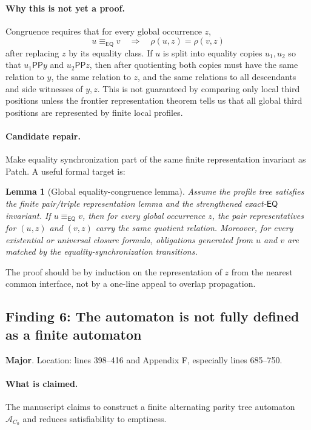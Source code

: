 \documentclass[11pt]{article}
\newcommand{\EQ}{\mathsf{EQ}}
\newcommand{\PP}{\mathsf{PP}}
\newcommand{\Aut}{\mathcal A}
\newtheorem{lemma}{Lemma}
\newcommand{\Major}{\textbf{\textcolor{maj}{Major}}}
\begin{document}
\paragraph{Why this is not yet a proof.}
Congruence requires that for every global occurrence $z$,
\[
  u\equiv_{\EQ}v \quad\Longrightarrow\quad
  \rho(u,z)=\rho(v,z)
\]
after replacing $z$ by its equality class.  If $u$ is split into equality copies $u_1,u_2$ so that $u_1\PP y$ and $u_2\PP z$, then after quotienting both copies must have the same relation to $y$, the same relation to $z$, and the same relations to all descendants and side witnesses of $y,z$.  This is not guaranteed by comparing only local third positions unless the frontier representation theorem tells us that all global third positions are represented by finite local profiles.

\paragraph{Candidate repair.}
Make equality synchronization part of the same finite representation invariant as \textsf{Patch}.  A useful formal target is:

\begin{lemma}[Global equality-congruence lemma]
Assume the profile tree satisfies the finite pair/triple representation lemma and the strengthened exact-$\EQ$ invariant.  If $u\equiv_{\EQ}v$, then for every global occurrence $z$, the pair representatives for $(u,z)$ and $(v,z)$ carry the same quotient relation.  Moreover, for every existential or universal closure formula, obligations generated from $u$ and $v$ are matched by the equality-synchronization transitions.
\end{lemma}

The proof should be by induction on the representation of $z$ from the nearest common interface, not by a one-line appeal to overlap propagation.

\subsection{Finding 6: The automaton is not fully defined as a finite automaton}

\noindent\Major.  Location: lines 398--416 and Appendix F, especially lines 685--750.

\paragraph{What is claimed.}
The manuscript claims to construct a finite alternating parity tree automaton $\Aut_{C_0}$ and reduces satisfiability to emptiness.
\end{document}
